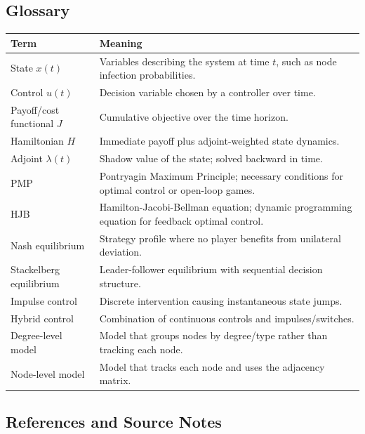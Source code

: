 \documentclass[11pt,a4paper]{article}
\begin{document}
\subsection{Glossary}
\begin{longtable}{L{4.0cm}L{11.0cm}}
\toprule
\textbf{Term} & \textbf{Meaning} \\
\midrule
\endhead
State $x(t)$ & Variables describing the system at time $t$, such as node infection probabilities. \\
Control $u(t)$ & Decision variable chosen by a controller over time. \\
Payoff/cost functional $J$ & Cumulative objective over the time horizon. \\
Hamiltonian $H$ & Immediate payoff plus adjoint-weighted state dynamics. \\
Adjoint $\lambda(t)$ & Shadow value of the state; solved backward in time. \\
PMP & Pontryagin Maximum Principle; necessary conditions for optimal control or open-loop games. \\
HJB & Hamilton-Jacobi-Bellman equation; dynamic programming equation for feedback optimal control. \\
Nash equilibrium & Strategy profile where no player benefits from unilateral deviation. \\
Stackelberg equilibrium & Leader-follower equilibrium with sequential decision structure. \\
Impulse control & Discrete intervention causing instantaneous state jumps. \\
Hybrid control & Combination of continuous controls and impulses/switches. \\
Degree-level model & Model that groups nodes by degree/type rather than tracking each node. \\
Node-level model & Model that tracks each node and uses the adjacency matrix. \\
\bottomrule
\end{longtable}

\subsection{References and Source Notes}
\end{document}
